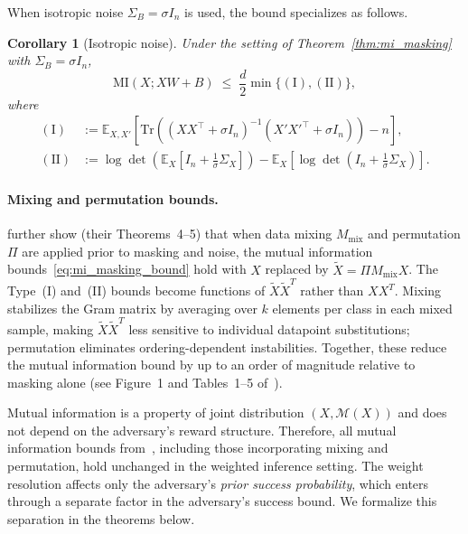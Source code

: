 \documentclass[sigconf,anonymous, review]{acmart}
\newcommand{\MI}{\mathrm{MI}}
\newtheorem{corollary}[theorem]{Corollary}
\begin{document}
When isotropic noise $\Sigma_B = \sigma I_n$ is used, the bound specializes as follows.

\begin{corollary}[Isotropic noise]
\label{cor:thm2_isotropic}
Under the setting of Theorem~\ref{thm:mi_masking} with $\Sigma_B = \sigma I_n$,
\begin{equation*}
\MI(X; XW + B) \;\le\; \frac{d}{2} \min \{ \mathrm{(I)}, \mathrm{(II)} \},
\end{equation*}
where
\begin{align*}
\mathrm{(I)} &:= \mathbb{E}_{X,X'}\!\left[
\mathrm{Tr}\!\left(
(XX^\top + \sigma I_n)^{-1}(X'X'^\top + \sigma I_n)
\right) - n
\right], \\
\mathrm{(II)} &:= \log \det\!\left(
\mathbb{E}_X\!\left[
I_n + \tfrac{1}{\sigma}\Sigma_X
\right]
\right)
- \mathbb{E}_X\!\left[
\log \det\!\left(
I_n + \tfrac{1}{\sigma}\Sigma_X
\right)
\right].
\end{align*}
\end{corollary}

\paragraph{Mixing and permutation bounds.}
\cite{xiao2024formal} further show (their Theorems~4--5) that when data mixing $M_{\mathrm{mix}}$ and permutation $\Pi$ are applied prior to masking and noise, the mutual information bounds~\eqref{eq:mi_masking_bound} hold with $X$ replaced by $\tilde{X} = \Pi M_{\mathrm{mix}} X$. The Type~(I) and~(II) bounds become functions of $\tilde{X}\tilde{X}^T$ rather than $XX^T$. Mixing stabilizes the Gram matrix by averaging over $k$ elements per class in each mixed sample, making $\tilde{X}\tilde{X}^T$ less sensitive to individual datapoint substitutions; permutation eliminates ordering-dependent instabilities. Together, these reduce the mutual information bound by up to an order of magnitude relative to masking alone (see Figure~1 and Tables~1--5 of~\cite{xiao2024formal}).

Mutual information is a property of joint distribution $(X, \mathcal{M}(X))$ and does not depend on the adversary's reward structure. Therefore, all mutual information bounds from~\cite{xiao2024formal}, including those incorporating mixing and permutation, hold unchanged in the weighted inference setting. The weight resolution affects only the adversary's \emph{prior success probability}, which enters through a separate factor in the adversary's success bound. We formalize this separation in the theorems below.
\end{document}

